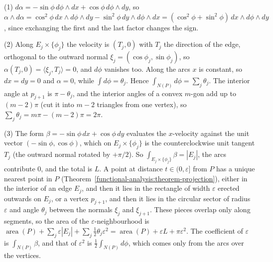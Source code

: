 \begin{solution}
(1) $d\alpha = -\sin\phi\,d\phi \wedge dx + \cos\phi\,d\phi \wedge dy$, so
$\alpha \wedge d\alpha = \cos^2\phi\,dx \wedge d\phi \wedge dy - \sin^2\phi\,dy \wedge d\phi \wedge dx = (\cos^2\phi + \sin^2\phi)\,dx \wedge d\phi \wedge dy$, since exchanging the first and the last factor changes the sign.

(2) Along $E_j \times \{\phi_j\}$ the velocity is $(T_j, 0)$ with $T_j$ the direction of the edge, orthogonal to the outward normal $\xi_j = (\cos\phi_j, \sin\phi_j)$, so $\alpha(T_j, 0) = \langle\xi_j, T_j\rangle = 0$, and
$d\phi$ vanishes too. Along the arcs $x$ is constant, so $dx = dy = 0$ and $\alpha = 0$, while $\int d\phi = \theta_j$. Hence $\int_{N(P)}d\phi = \sum_j\theta_j$. The interior angle at $p_{j+1}$ is $\pi - \theta_j$, and the
interior angles of a convex $m$-gon add up to $(m - 2)\pi$ (cut it into $m - 2$ triangles from one vertex), so $\sum_j\theta_j = m\pi - (m - 2)\pi = 2\pi$.

(3) The form $\beta = -\sin\phi\,dx + \cos\phi\,dy$ evaluates the $x$-velocity against the unit vector $(-\sin\phi, \cos\phi)$, which on $E_j \times \{\phi_j\}$ is the counterclockwise unit tangent $T_j$ (the
outward normal rotated by $+\pi/2$). So $\int_{E_j \times \{\phi_j\}}\beta = |E_j|$, the arcs contribute $0$, and the total is $L$. A point at distance $t \in (0, \varepsilon]$ from $P$ has a unique nearest point in $P$
(Theorem~\ref{functional-analysis:theorem-projection}), either in the interior of an edge $E_j$, and then it lies in the rectangle of width $\varepsilon$ erected
outwards on $E_j$, or a vertex $p_{j+1}$, and then it lies in the circular sector of radius $\varepsilon$ and angle $\theta_j$ between the normals $\xi_j$ and $\xi_{j+1}$. These pieces overlap only along segments, so
the area of the $\varepsilon$-neighbourhood is $\operatorname{area}(P) + \sum_j\varepsilon|E_j| + \sum_j\frac12\theta_j\varepsilon^2 = \operatorname{area}(P) + \varepsilon L + \pi\varepsilon^2$. The
coefficient of $\varepsilon$ is $\int_{N(P)}\beta$, and that of $\varepsilon^2$ is $\frac12\int_{N(P)}d\phi$, which comes only from the arcs over the vertices.
\end{solution}

